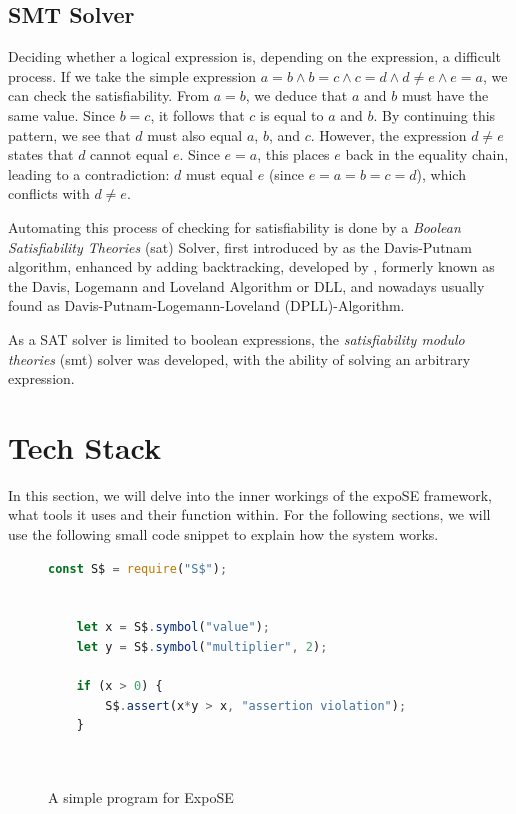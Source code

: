 \FloatBarrier
\subsection{SMT Solver}
\label{sec:smtsolver}
Deciding whether a logical expression is, depending on the expression, a difficult process.
If we take the simple expression $a = b \land b= c\land c = d \land d \neq e \land e = a$, we can check the satisfiability. From $a = b$, we deduce that $a$ and $b$ must have the same value. Since $b = c$, it follows that $c$ is equal to $a$ and $b$. By continuing this pattern, we see that $d$ must also equal $a$, $b$, and $c$. However, the expression $d \neq e$ states that $d$ cannot equal $e$. Since $e = a$, this places $e$ back in the equality chain, leading to a contradiction: $d$ must equal $e$ (since $e = a = b = c = d$), which conflicts with $d \neq e$.

Automating this process of checking for satisfiability is done by a \textit{Boolean Satisfiability Theories} (\gls{sat}) Solver, first introduced by  \citet{davis_computing_1960} as the Davis-Putnam algorithm, enhanced by adding backtracking, developed by \citet{davis_machine_1962}, formerly known as the Davis, Logemann and Loveland Algorithm or DLL, and nowadays usually found as Davis-Putnam-Logemann-Loveland (DPLL)-Algorithm. 

As a SAT solver is limited to boolean expressions, the \textit{satisfiability modulo theories }(\gls{smt}) solver was developed, with the ability of solving an arbitrary expression.

\cite{barrett_satisfiability_2009}


\section{Tech Stack}
\label{sec:tech}
In this section, we will delve into the inner workings of the expoSE framework, what tools it uses and their function within. 
For the following sections, we will use the following small code snippet to explain how the system works. 


\begin{figure}[h]
    \begin{lstlisting}[language=JavaScript, gobble=4]
    const S$ = require("S$");
    

    let x = S$.symbol("value"); 
    let y = S$.symbol("multiplier", 2);
    
    if (x > 0) {
        S$.assert(x*y > x, "assertion violation"); 
    }
    
   
    \end{lstlisting}
    \caption{A simple program for ExpoSE}
    \label{fig:expose-sample-program}
\end{figure}



